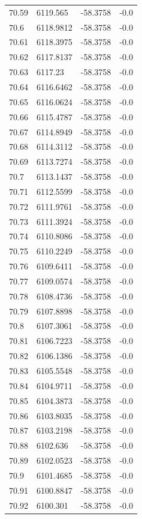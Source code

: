 \begin{table}[H]
\begin{tabular}{llll}
70.59 & 6119.565 & -58.3758 & -0.0 \\
70.6 & 6118.9812 & -58.3758 & -0.0 \\
70.61 & 6118.3975 & -58.3758 & -0.0 \\
70.62 & 6117.8137 & -58.3758 & -0.0 \\
70.63 & 6117.23 & -58.3758 & -0.0 \\
70.64 & 6116.6462 & -58.3758 & -0.0 \\
70.65 & 6116.0624 & -58.3758 & -0.0 \\
70.66 & 6115.4787 & -58.3758 & -0.0 \\
70.67 & 6114.8949 & -58.3758 & -0.0 \\
70.68 & 6114.3112 & -58.3758 & -0.0 \\
70.69 & 6113.7274 & -58.3758 & -0.0 \\
70.7 & 6113.1437 & -58.3758 & -0.0 \\
70.71 & 6112.5599 & -58.3758 & -0.0 \\
70.72 & 6111.9761 & -58.3758 & -0.0 \\
70.73 & 6111.3924 & -58.3758 & -0.0 \\
70.74 & 6110.8086 & -58.3758 & -0.0 \\
70.75 & 6110.2249 & -58.3758 & -0.0 \\
70.76 & 6109.6411 & -58.3758 & -0.0 \\
70.77 & 6109.0574 & -58.3758 & -0.0 \\
70.78 & 6108.4736 & -58.3758 & -0.0 \\
70.79 & 6107.8898 & -58.3758 & -0.0 \\
70.8 & 6107.3061 & -58.3758 & -0.0 \\
70.81 & 6106.7223 & -58.3758 & -0.0 \\
70.82 & 6106.1386 & -58.3758 & -0.0 \\
70.83 & 6105.5548 & -58.3758 & -0.0 \\
70.84 & 6104.9711 & -58.3758 & -0.0 \\
70.85 & 6104.3873 & -58.3758 & -0.0 \\
70.86 & 6103.8035 & -58.3758 & -0.0 \\
70.87 & 6103.2198 & -58.3758 & -0.0 \\
70.88 & 6102.636 & -58.3758 & -0.0 \\
70.89 & 6102.0523 & -58.3758 & -0.0 \\
70.9 & 6101.4685 & -58.3758 & -0.0 \\
70.91 & 6100.8847 & -58.3758 & -0.0 \\
70.92 & 6100.301 & -58.3758 & -0.0 \\

\end{tabular}
\end{table}
